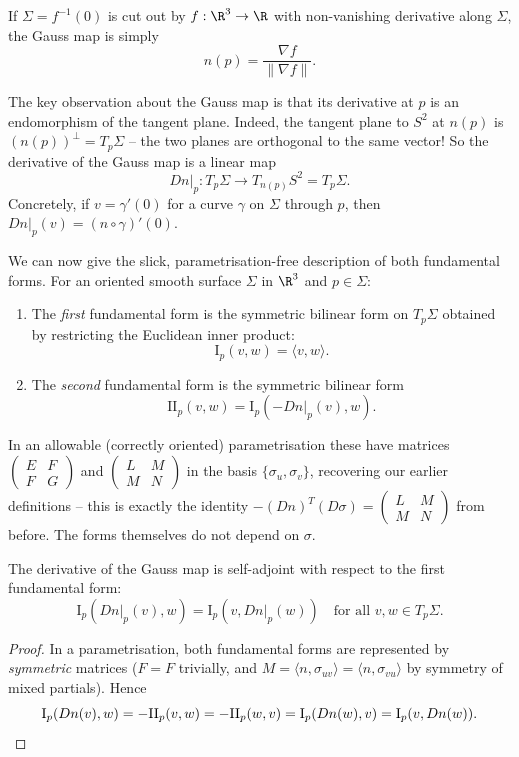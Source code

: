 \begin{remark}
    If $\Sigma = f^{-1}(0)$ is cut out by $f: \R^3 \rightarrow \R$ with non-vanishing derivative along $\Sigma$, the Gauss map is simply
    $$
    n(p) = \frac{\nabla f}{\|\nabla f\|}.
    $$
\end{remark}

The key observation about the Gauss map is that its derivative at $p$ is an endomorphism of the tangent plane. Indeed, the tangent plane to $S^2$ at $n(p)$ is $(n(p))^\perp = T_p\Sigma$ -- the two planes are orthogonal to the same vector! So the derivative of the Gauss map is a linear map
$$
\left.Dn\right|_p : T_p \Sigma \rightarrow T_{n(p)} S^2 = T_p \Sigma.
$$
Concretely, if $v = \gamma'(0)$ for a curve $\gamma$ on $\Sigma$ through $p$, then $\left.Dn\right|_p(v) = (n \circ \gamma)'(0)$.

We can now give the slick, parametrisation-free description of both fundamental forms. For an oriented smooth surface $\Sigma$ in $\R^3$ and $p \in \Sigma$:
\begin{enumerate}[label=(\roman*)]
    \item The \emph{first} fundamental form is the symmetric bilinear form on $T_p\Sigma$ obtained by restricting the Euclidean inner product:
    $$
    \mathrm{I}_p(v, w) = \langle v, w \rangle.
    $$
    \item The \emph{second} fundamental form is the symmetric bilinear form
    $$
    \mathrm{II}_p (v, w) = \mathrm{I}_p\left(-\left.Dn\right|_p(v), w\right).
    $$
\end{enumerate}
In an allowable (correctly oriented) parametrisation these have matrices $\begin{pmatrix} E & F \\ F & G\end{pmatrix}$ and $\begin{pmatrix} L & M \\ M & N \end{pmatrix}$ in the basis $\{\sigma_u, \sigma_v\}$, recovering our earlier definitions -- this is exactly the identity $-(Dn)^T(D\sigma) = \begin{pmatrix} L & M \\ M & N\end{pmatrix}$ from before. The forms themselves do not depend on $\sigma$.

\begin{lemma}
    The derivative of the Gauss map is self-adjoint with respect to the first fundamental form:
    $$
    \mathrm{I}_p\left(\left.Dn\right|_p(v), w\right) = \mathrm{I}_p\left(v, \left.Dn\right|_p(w)\right) \quad \text{for all } v, w \in T_p\Sigma.
    $$
\end{lemma}
\begin{proof}
    In a parametrisation, both fundamental forms are represented by \emph{symmetric} matrices ($F = F$ trivially, and $M = \langle n, \sigma_{uv}\rangle = \langle n, \sigma_{vu} \rangle$ by symmetry of mixed partials). Hence
    $$
    \mathrm{I}_p(Dn(v), w) = -\mathrm{II}_p(v, w) = -\mathrm{II}_p(w, v) = \mathrm{I}_p(Dn(w), v) = \mathrm{I}_p(v, Dn(w)). \qedhere
    $$
\end{proof}

